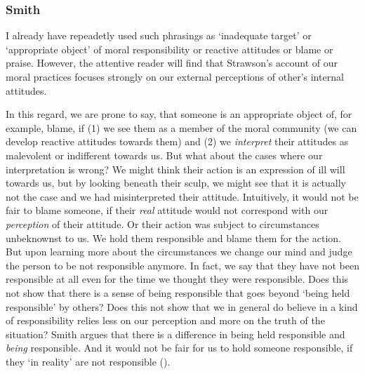 \documentclass{article}
\newcounter{example}[section]
\begin{document}
\subsubsection{Smith}

 I already have repeadetly used such phrasings as `inadequate target' or
 `appropriate object' of moral responsibility or reactive attitudes or blame or
 praise. However, the attentive reader will find that Strawson's account of our
 moral practices focuses strongly on our external perceptions of other's
 internal attitudes.

 In this regard, we are prone to say, that someone is an
 appropriate object of, for example, blame, if (1) we see them as a member of the moral
 community (we can develop reactive attitudes towards them) and (2) we
 \textit{interpret} their attitudes as malevolent or indifferent towards us. But what
 about the cases where our interpretation is wrong? We might think their action
 is an expression of ill will towards us, but by looking beneath their sculp, we
 might see that it is actually not the case and we had misinterpreted their
 attitude. Intuitively, it would not be fair to blame someone, if their \textit{real}
 attitude would not correspond with our \textit{perception} of their attitude.
 Or their action was subject to circumstances unbeknownst to us. We hold them
 responsible and blame them for the action. But upon learning more about the
 circumstances we change our mind and judge the person to be not responsible
 anymore. In fact, we say that they have not been responsible at all even for the
 time we thought they were responsible. Does this not show that there is a sense
 of being responsible that goes beyond `being held responsible' by others? Does
 this not show that we in general do believe in a kind of responsibility relies
 less on our perception and more on the truth of the situation? 
 Smith argues that there is a difference in being held responsible and 
 \textit{being} responsible. And it would not be fair for us to hold someone
 responsible, if they `in reality' are not responsible (\cite[p.
 472]{Smith_2007}).\\




%
%
\end{document}
